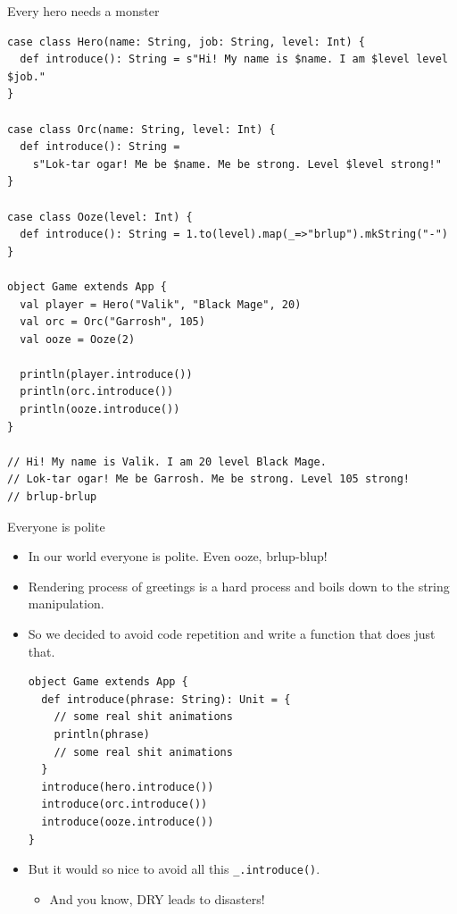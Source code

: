 \documentclass[presentation,aspectratio=169,smaller]{beamer}
\begin{document}
\begin{frame}[label={sec:orgadf568f},fragile]{Every hero needs a monster}
 \begin{verbatim}
case class Hero(name: String, job: String, level: Int) {
  def introduce(): String = s"Hi! My name is $name. I am $level level $job."
}

case class Orc(name: String, level: Int) {
  def introduce(): String =
    s"Lok-tar ogar! Me be $name. Me be strong. Level $level strong!"
}

case class Ooze(level: Int) {
  def introduce(): String = 1.to(level).map(_=>"brlup").mkString("-")
}

object Game extends App {
  val player = Hero("Valik", "Black Mage", 20)
  val orc = Orc("Garrosh", 105)
  val ooze = Ooze(2)

  println(player.introduce())
  println(orc.introduce())
  println(ooze.introduce())
}

// Hi! My name is Valik. I am 20 level Black Mage.
// Lok-tar ogar! Me be Garrosh. Me be strong. Level 105 strong!
// brlup-brlup
\end{verbatim}
\end{frame}

\begin{frame}[label={sec:org2b4c5db},fragile]{Everyone is polite}
 \begin{itemize}
\item In our world everyone is polite. Even ooze, brlup-blup!
\item Rendering process of greetings is a hard process and boils down to the string
manipulation.
\item So we decided to avoid code repetition and write a function that does just that.

\begin{verbatim}
object Game extends App {
  def introduce(phrase: String): Unit = {
    // some real shit animations
    println(phrase)
    // some real shit animations
  }
  introduce(hero.introduce())
  introduce(orc.introduce())
  introduce(ooze.introduce())
}
\end{verbatim}

\item But it would so nice to avoid all this \texttt{\_.introduce()}.
\begin{itemize}
\item And you know, DRY leads to disasters!
\end{itemize}
\end{itemize}
\end{frame}
\end{document}
